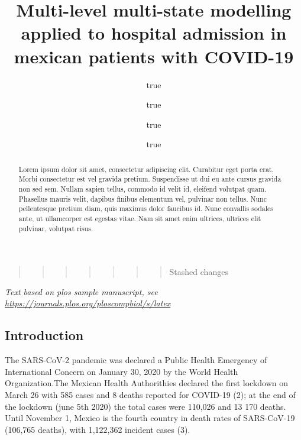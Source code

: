 \documentclass[
]{article}
\title{Multi-level multi-state modelling applied to hospital admission
in mexican patients with COVID-19}
\author{true \and true \and true \and true}
\date{}
\begin{document}
\maketitle
\begin{abstract}
Lorem ipsum dolor sit amet, consectetur adipiscing elit. Curabitur eget
porta erat. Morbi consectetur est vel gravida pretium. Suspendisse ut
dui eu ante cursus gravida non sed sem. Nullam sapien tellus, commodo id
velit id, eleifend volutpat quam. Phasellus mauris velit, dapibus
finibus elementum vel, pulvinar non tellus. Nunc pellentesque pretium
diam, quis maximus dolor faucibus id. Nunc convallis sodales ante, ut
ullamcorper est egestas vitae. Nam sit amet enim ultrices, ultrices elit
pulvinar, volutpat risus.
\end{abstract}

\begin{quote}
\begin{quote}
\begin{quote}
\begin{quote}
\begin{quote}
\begin{quote}
\begin{quote}
Stashed changes \newcommand{\N}{\mathbb{N}} \newcommand{\Z}{\mathbb{Z}}
\newcommand{\R}{\mathbb{R}} \newcommand{\Q}{\mathbb{Q}}
\newcommand{\vac}{\varnothing} \newcommand{\Pro}{\mathbb{P}}
\newcommand{\var}{\text{Var}} \newcommand{\E}{\mathbb{E}}
\end{quote}
\end{quote}
\end{quote}
\end{quote}
\end{quote}
\end{quote}
\end{quote}

\emph{Text based on plos sample manuscript, see
\url{https://journals.plos.org/ploscompbiol/s/latex}}

\hypertarget{introduction}{%
\subsection{Introduction}\label{introduction}}

The SARS-CoV-2 pandemic was declared a Public Health Emergency of
International Concern on January 30, 2020 by the World Health
Organization.The Mexican Health Authorithies declared the first lockdown
on March 26 with 585 cases and 8 deaths reported for COVID-19 (2); at
the end of the lockdown (june 5th 2020) the total cases were 110,026 and
13 170 deaths. Until November 1, Mexico is the fourth country in death
rates of SARS-CoV-19 (106,765 deaths), with 1,122,362 incident cases
(3).
\end{document}
